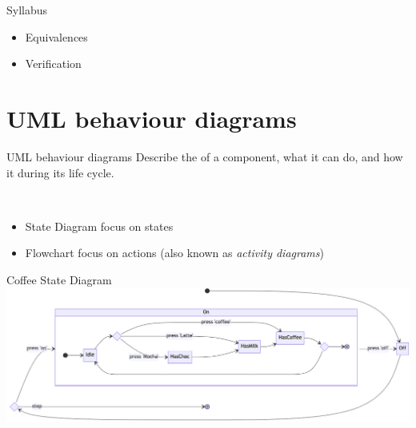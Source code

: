 \documentclass[aspectratio=169]{beamer}
\begin{document}
\begin{slide}{Syllabus}
{\begin{itemize}
\begin{itemize}
{\begin{itemize}
  diagrams
        \item Formal modelling: Process algebra with interactions
      \end{itemize}
      }
      \item Equivalences
      \item Verification
    \end{itemize}
  \end{itemize}
  }
\end{slide}


\section{UML behaviour diagrams}

\begin{slide}{UML behaviour diagrams}
  Describe the  of a component, what  it can do, and how it  during its life cycle.

  ~\\[5mm]

  \begin{itemize}
    \item \alert{State Diagram} focus on states
    \item \alert{Flowchart} focus on actions (also known as \emph{activity diagrams})
  \end{itemize}
\end{slide}


\begin{slide}{Coffee State Diagram}
    \includegraphics[width=1.0\textwidth]{images/diagrams/coffee-state.png}
\end{slide}
\end{document}
